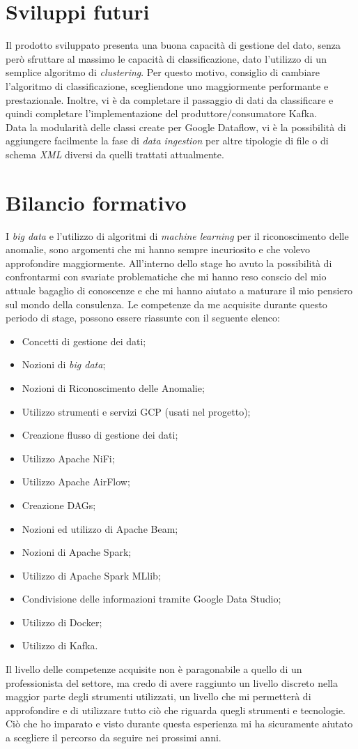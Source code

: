 \section{Sviluppi futuri}
Il prodotto sviluppato presenta una buona capacità di gestione del dato, senza però sfruttare al massimo le capacità di classificazione, dato l'utilizzo di un semplice algoritmo di \emph{clustering}. Per questo motivo, consiglio di cambiare l'algoritmo di classificazione, scegliendone uno maggiormente performante e prestazionale. Inoltre, vi è da completare il passaggio di dati da classificare e quindi completare l'implementazione del produttore/consumatore Kafka.
\\
Data la modularità delle classi create per Google Dataflow, vi è la possibilità di aggiungere facilmente la fase di \emph{data ingestion} per altre tipologie di file o di schema \emph{XML} diversi da quelli trattati attualmente.
\section{Bilancio formativo}
I \emph{big data} e l'utilizzo di algoritmi di \emph{machine learning} per il riconoscimento delle anomalie, sono argomenti che mi hanno sempre incuriosito e che volevo approfondire maggiormente. All'interno dello stage ho avuto la possibilità di confrontarmi con svariate problematiche che mi hanno reso conscio del mio attuale bagaglio di conoscenze e che mi hanno aiutato a maturare il mio pensiero sul mondo della consulenza.
Le competenze da me acquisite durante questo periodo di stage, possono essere riassunte con il seguente elenco:
\begin{itemize}
	\item Concetti di gestione dei dati; 
	\item Nozioni di \emph{big data};
	\item Nozioni di Riconoscimento delle Anomalie;
	\item Utilizzo strumenti e servizi GCP (usati nel progetto);
	\item Creazione flusso di gestione dei dati;
	\item Utilizzo Apache NiFi;
	\item Utilizzo Apache AirFlow;
	\item Creazione DAGs;
	\item Nozioni ed utilizzo di Apache Beam;
	\item Nozioni di Apache Spark;
	\item Utilizzo di Apache Spark MLlib;
	\item Condivisione delle informazioni tramite Google Data Studio;
	\item Utilizzo di Docker;
	\item Utilizzo di Kafka.
\end{itemize}
Il livello delle competenze acquisite non è paragonabile a quello di un professionista del settore, ma credo di avere raggiunto un livello discreto nella maggior parte degli strumenti utilizzati, un livello che mi permetterà di approfondire e di utilizzare tutto ciò che riguarda quegli strumenti e tecnologie.
Ciò che ho imparato e visto durante questa esperienza mi ha sicuramente aiutato a scegliere il percorso da seguire nei prossimi anni.
